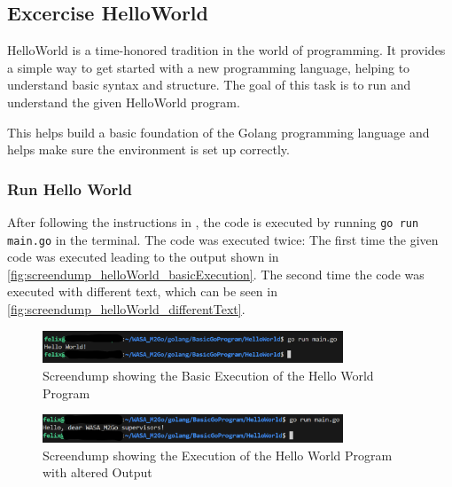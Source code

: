 \subsection{Excercise HelloWorld}
\label{sec:excercise_hello_world}
HelloWorld is a time-honored tradition in the world of programming.
It provides a simple way to get started with a new programming language, helping to understand basic syntax and structure.
The goal of this task is to run and understand the given HelloWorld program.

This helps build a basic foundation of the Golang programming language and helps make sure the environment is set up correctly.

\subsubsection*{Run Hello World}
After following the instructions in \cite{MS-VSC}, the code is executed by running \texttt{go run main.go} in the terminal.
The code was executed twice: The first time the given code was executed leading to the output shown in \autoref{fig:screendump_helloWorld_basicExecution}.
The second time the code was executed with different text, which can be seen in \autoref{fig:screendump_helloWorld_differentText}.

\begin{figure}[H]
    \centering
    \includegraphics[width=0.8\textwidth]{figures/goLang/helloWorld/golang_helloWorld_basicExecution.png}
    \caption{Screendump showing the Basic Execution of the Hello World Program}
    \label{fig:screendump_helloWorld_basicExecution}
\end{figure}

\begin{figure}[H]
    \centering
    \includegraphics[width=0.8\textwidth]{figures/goLang/helloWorld/golang_helloWorld_ExecutionDifferentText.png}
    \caption{Screendump showing the Execution of the Hello World Program with altered Output}
    \label{fig:screendump_helloWorld_differentText}
\end{figure}

